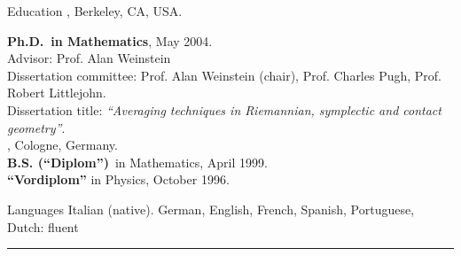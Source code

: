 \documentclass[12p]{resume}
\begin{document}
\begin{category}{Education}
, Berkeley, CA, USA. 


\textbf{Ph.D.~in Mathematics}, May 2004.\\
Advisor: Prof. Alan
Weinstein\\
Dissertation committee: Prof. Alan
Weinstein (chair), Prof. Charles Pugh, Prof. Robert Littlejohn.\\
Dissertation title:  \emph{``Averaging techniques in Riemannian, symplectic and contact geometry''}.\\

, Cologne, Germany.\\
\textbf{B.S. (``Diplom'')}~in Mathematics, April 1999.\\
\textbf{``Vordiplom''} in Physics, October 1996.\\

\end{category}


\begin{category}{Languages}
\citemnobullet
Italian (native). German, English, French, Spanish, Portuguese, Dutch: fluent\\
\end{category}



 
\hrule{}

\end{document}
